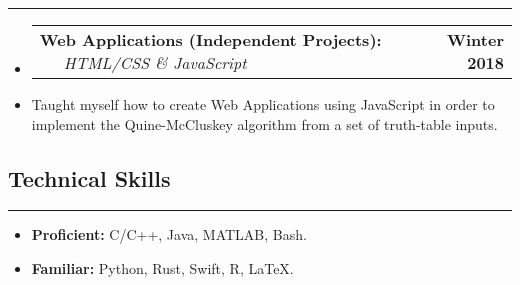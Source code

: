 \documentclass[10pt,letterpaper]{article}
\makeatletter
\newcommand{\header}[2]
{
	\begin{tabular*}{\linewidth}{l @{\extracolsep{\fill}} r}
		\hspace{-27pt} #1 & #2 \\
	\end{tabular*}
}
\newcommand{\sectionbreak}
{
	\vspace{-1.2em}
	\rule{\textwidth}{1.7pt}
	\vspace{-1.7em}
}
\makeatother
\begin{document}
\hrule

\begin{itemize}
	\item[]
		\header
		{	
			\textbf{Web Applications (Independent Projects): }
			\href{https://aashpointo.github.io/KmapWebsite/}{\emph{\underline{\smash{aashpointo.github.io/KmapWebsite}}}} \ \ \ \footnotesize \emph{HTML/CSS \& JavaScript}
		}
		{\textbf{Winter 2018}}
	\item
		Taught myself how to create Web Applications using JavaScript in order to implement the Quine-McCluskey algorithm from a set of truth-table inputs.

\end{itemize}

\vspace{-1.5em}
\subsection*{Technical Skills}
\sectionbreak

\begin{itemize}

	\item
		\textbf{Proficient:} C/C++, Java, MATLAB, Bash.
	\item
		\textbf{Familiar:} Python, Rust, Swift, R, \LaTeX.
\end{itemize}
\end{document}
